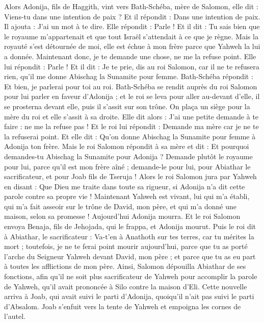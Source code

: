 \begin{multicols}{2}
Alors Adonija, fils de Haggith, vint vers Bath-Schéba, mère de Salomon, elle dit : Viens-tu dans une intention de paix ? Et il répondit : Dans une intention de paix.
Il ajouta : J'ai un mot à te dire. Elle répondit : Parle !
Et il dit : Tu sais bien que le royaume m'appartenait et que tout Israël s'attendait à ce que je règne. Mais la royauté s'est détournée de moi, elle est échue à mon frère parce que Yahweh la lui a donnée.
Maintenant donc, je te demande une chose, ne me la refuse point. Elle lui répondit : Parle !
Et il dit : Je te prie, dis au roi Salomon, car il ne te refusera rien, qu'il me donne Abischag la Sunamite pour femme.
Bath-Schéba répondit : Et bien, je parlerai pour toi au roi.
Bath-Schéba se rendit auprès du roi Salomon pour lui parler en faveur d'Adonija ; et le roi se leva pour aller au-devant d'elle, il se prosterna devant elle, puis il s'assit sur son trône. On plaça un siège pour la mère du roi et elle s'assit à sa droite.
Elle dit alors : J'ai une petite demande à te faire : ne me la refuse pas ! Et le roi lui répondit : Demande ma mère car je ne te la refuserai point.
Et elle dit : Qu'on donne Abischag la Sunamite pour femme à Adonija ton frère.
Mais le roi Salomon répondit à sa mère et dit : Et pourquoi demandes-tu Abischag la Sunamite pour Adonija ? Demande plutôt le royaume pour lui, parce qu'il est mon frère aîné ; demande-le pour lui, pour Abiathar le sacrificateur, et pour Joab fils de Tseruja !
Alors le roi Salomon jura par Yahweh en disant : Que Dieu me traite dans toute sa rigueur, si Adonija n'a dit cette parole contre sa propre vie !
Maintenant Yahweh est vivant, lui qui m'a établi, qui m'a fait asseoir sur le trône de David, mon père, et qui m'a donné une maison, selon sa promesse ! Aujourd'hui Adonija mourra.
Et le roi Salomon envoya Benaja, fils de Jehojada, qui le frappa, et Adonija mourut.
Puis le roi dit à Abiathar, le sacrificateur : Va-t'en à Anathoth sur tes terres, car tu mérites la mort ; toutefois, je ne te ferai point mourir aujourd'hui, parce que tu as porté l'arche du Seigneur Yahweh devant David, mon père ; et parce que tu as eu part à toutes les afflictions de mon père.
Ainsi, Salomon dépouilla Abiathar de ses fonctions, afin qu'il ne soit plus sacrificateur de Yahweh pour accomplir la parole de Yahweh, qu'il avait prononcée à Silo contre la maison d'Eli.
Cette nouvelle arriva à Joab, qui avait suivi le parti d'Adonija, quoiqu'il n'ait pas suivi le parti d'Absalom. Joab s'enfuit vers la tente de Yahweh et empoigna les cornes de l'autel.

\end{multicols}
